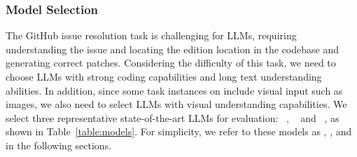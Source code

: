 

\subsubsection{Model Selection}



The GitHub issue resolution task is challenging for LLMs, requiring understanding the issue and locating the edition location in the codebase and generating correct patches. Considering the difficulty of this task,  we need to choose LLMs with strong coding capabilities and long text understanding abilities. In addition, since some task instances on \Swebenchx include visual input such as images, we also need to select LLMs with visual understanding capabilities. We select three representative state-of-the-art LLMs for evaluation: \GPTFullName~\cite{gpt-4o}, \ClaudeFullName~\cite{claude-3-5-sonnet} and \DeepSeekFullName~\cite{deepseekV25}, as shown in Table~\ref{table:models}. For simplicity, we refer to these models as \GPT, \Claude, and \DeepSeek in the following sections.




\begin{table}[t]
  \centering
  \footnotesize
  \setlength\tabcolsep{6pt}  %
     \caption{Overview of evaluated LLMs.}
     \tabmargin
  \renewcommand{\arraystretch}{1.2}  %


 
      \label{table:models}
\end{table}




